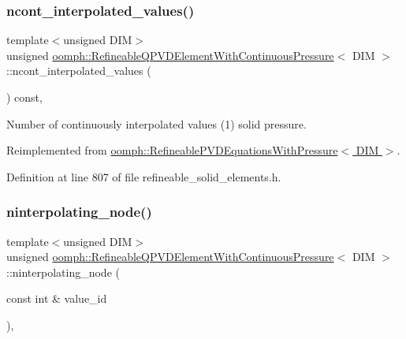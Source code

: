 \subsubsection{\texorpdfstring{ncont\+\_\+interpolated\+\_\+values()}{ncont\_interpolated\_values()}}
{\footnotesize\ttfamily template$<$unsigned D\+IM$>$ \\
unsigned \hyperlink{classoomph_1_1RefineableQPVDElementWithContinuousPressure}{oomph\+::\+Refineable\+Q\+P\+V\+D\+Element\+With\+Continuous\+Pressure}$<$ D\+IM $>$\+::ncont\+\_\+interpolated\+\_\+values (\begin{DoxyParamCaption}{ }\end{DoxyParamCaption}) const\hspace{0.3cm}{\ttfamily [inline]}, {\ttfamily [virtual]}}



Number of continuously interpolated values (1) solid pressure. 



Reimplemented from \hyperlink{classoomph_1_1RefineablePVDEquationsWithPressure_a16bc4f58cc9a079c8db705306a23b41b}{oomph\+::\+Refineable\+P\+V\+D\+Equations\+With\+Pressure$<$ D\+I\+M $>$}.



Definition at line 807 of file refineable\+\_\+solid\+\_\+elements.\+h.

\mbox{\label{classoomph_1_1RefineableQPVDElementWithContinuousPressure_a376ff088df9caf8cbb9a653e8837987e}} 
\subsubsection{\texorpdfstring{ninterpolating\+\_\+node()}{ninterpolating\_node()}}
{\footnotesize\ttfamily template$<$unsigned D\+IM$>$ \\
unsigned \hyperlink{classoomph_1_1RefineableQPVDElementWithContinuousPressure}{oomph\+::\+Refineable\+Q\+P\+V\+D\+Element\+With\+Continuous\+Pressure}$<$ D\+IM $>$\+::ninterpolating\+\_\+node (\begin{DoxyParamCaption}\item[{const int \&}]{value\+\_\+id }\end{DoxyParamCaption})\hspace{0.3cm}{\ttfamily [inline]}, {\ttfamily [virtual]}}




